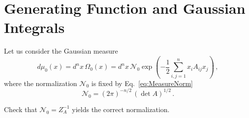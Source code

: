 \section{Generating Function and Gaussian Integrals}
\label{sec:gener-funct-gauss}

Let us consider the Gaussian measure
\begin{equation}
  \label{eq:GaussMeas}
  d\mu_0(x) = d^nx\, \Omega_0(x) = d^nx\, \mathcal{N}_0 \exp\left(
    -\frac12 \sum_{i,j=1}^n x_i A_{ij} x_j
    \right)\, ,
\end{equation}
where the normalization $\mathcal{N}_0$ is fixed by Eq.~\ref{eq:MeasureNorm}
\begin{equation}
  \label{eq:GaussNorm}
  \mathcal{N}_0 = \left(2\pi\right)^{-n/2}\, \left( \det A\right)^{1/2}\, .
\end{equation}

\begin{Ex}
  Check that $\mathcal{N}_0=Z_A^{-1}$ yields the correct normalization. 
\end{Ex}


